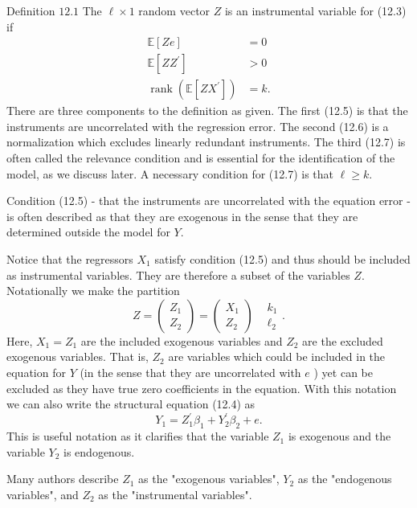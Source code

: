 \documentclass[10pt]{article}
\begin{document}
Definition $12.1$ The $\ell \times 1$ random vector $Z$ is an instrumental variable for (12.3) if
$$
\begin{aligned}
\mathbb{E}[Z e] &=0 \\
\mathbb{E}\left[Z Z^{\prime}\right] &>0 \\
\operatorname{rank}\left(\mathbb{E}\left[Z X^{\prime}\right]\right) &=k .
\end{aligned}
$$
There are three components to the definition as given. The first (12.5) is that the instruments are uncorrelated with the regression error. The second (12.6) is a normalization which excludes linearly redundant instruments. The third (12.7) is often called the relevance condition and is essential for the identification of the model, as we discuss later. A necessary condition for (12.7) is that $\ell \geq k$.

Condition (12.5) - that the instruments are uncorrelated with the equation error - is often described as that they are exogenous in the sense that they are determined outside the model for $Y$.

Notice that the regressors $X_{1}$ satisfy condition (12.5) and thus should be included as instrumental variables. They are therefore a subset of the variables $Z$. Notationally we make the partition
$$
Z=\left(\begin{array}{l}
Z_{1} \\
Z_{2}
\end{array}\right)=\left(\begin{array}{c}
X_{1} \\
Z_{2}
\end{array}\right) \begin{aligned}
&k_{1} \\
&\ell_{2}
\end{aligned} .
$$
Here, $X_{1}=Z_{1}$ are the included exogenous variables and $Z_{2}$ are the excluded exogenous variables. That is, $Z_{2}$ are variables which could be included in the equation for $Y$ (in the sense that they are uncorrelated with $e$ ) yet can be excluded as they have true zero coefficients in the equation. With this notation we can also write the structural equation (12.4) as
$$
Y_{1}=Z_{1}^{\prime} \beta_{1}+Y_{2}^{\prime} \beta_{2}+e .
$$
This is useful notation as it clarifies that the variable $Z_{1}$ is exogenous and the variable $Y_{2}$ is endogenous.

Many authors describe $Z_{1}$ as the "exogenous variables", $Y_{2}$ as the "endogenous variables", and $Z_{2}$ as the "instrumental variables".
\end{document}
